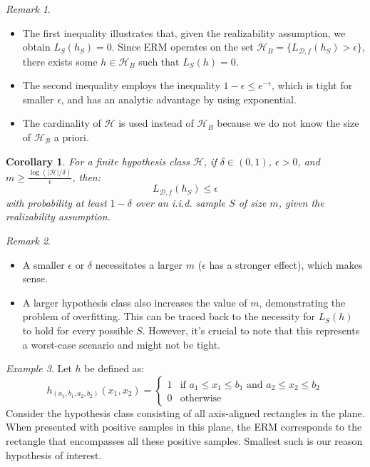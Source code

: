 \documentclass{article}
\newtheorem{corollary}[theorem]{Corollary}
\theoremstyle{remark}
\newtheorem{example}{Example}
\newtheorem{remark}[example]{Remark}
\begin{document}
\begin{remark}
\begin{itemize}
\item The first inequality illustrates that, given the realizability assumption, we obtain $L_S(h_S) = 0$. Since ERM operates on the set $\mathcal{H}_B=\{L_{\mathcal{D}, f}(h_S)>\epsilon\}$, there exists some $h\in \mathcal{H}_B$ such that $L_S(h) = 0$.
\item The second inequality employs the inequality $1-\epsilon \leq e^{-\epsilon}$, which is tight for smaller $\epsilon$, and has an analytic advantage by using exponential.
\item The cardinality of $\mathcal{H}$ is used instead of $\mathcal{H}_B$ because we do not know the size of $\mathcal{H_B}$ a priori.
\end{itemize}
\end{remark}

\begin{corollary}
For a finite hypothesis class $\mathcal{H}$, if $\delta\in (0,1)$, $\epsilon > 0$, and $m \geq \frac{\log(\lvert\mathcal{H}\rvert/\delta)}{\epsilon}$, then:
\[L_{\mathcal{D}, f}(h_S) \leq \epsilon\]
with probability at least $1-\delta$ over an i.i.d. sample $S$ of size $m$, given the realizability assumption.
\end{corollary}

\begin{remark}
\begin{itemize}
\item A smaller $\epsilon$ or $\delta$ necessitates a larger $m$ ($\epsilon$ has a stronger effect), which makes sense.
\item A larger hypothesis class also increases the value of $m$, demonstrating the problem of overfitting. This can be traced back to the necessity for $L_S(h)$ to hold for every possible $S$. However, it's crucial to note that this represents a worst-case scenario and might not be tight.
\end{itemize}
\end{remark}

\begin{example}
    Let \( h \) be defined as:
    \[
    h_{(a_1, b_1, a_2, b_2)}(x_1, x_2) = 
    \begin{cases} 
    1 & \text{if } a_1 \leq x_1 \leq b_1 \text{ and } a_2 \leq x_2 \leq b_2 \\
    0 & \text{otherwise}
    \end{cases}
    \]
    Consider the hypothesis class consisting of all axis-aligned rectangles in the plane.
    When presented with positive samples in this plane, the ERM corresponds to the rectangle that encompasses all these positive samples. Smallest such is our reason hypothesis of interest.
    
    
\end{example}
\end{document}
